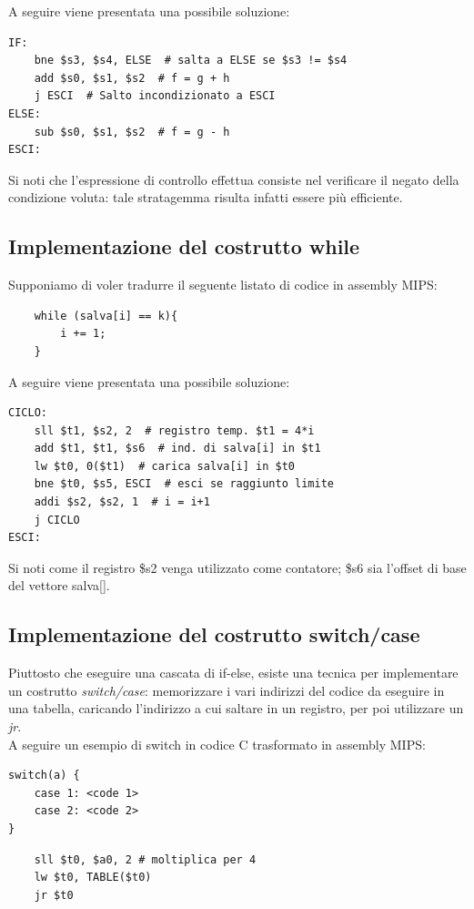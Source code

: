 \documentclass[class=book, crop=false]{standalone}
\begin{document}
A seguire viene presentata una possibile soluzione:
\begin{verbatim}
IF:
	bne $s3, $s4, ELSE  # salta a ELSE se $s3 != $s4
	add $s0, $s1, $s2  # f = g + h
	j ESCI  # Salto incondizionato a ESCI
ELSE:
	sub $s0, $s1, $s2  # f = g - h
ESCI:
\end{verbatim}
Si noti che l'espressione di controllo effettua consiste nel verificare il negato della condizione voluta: tale stratagemma risulta infatti essere più efficiente.

\subsection{Implementazione del costrutto while}
Supponiamo di voler tradurre il seguente listato di codice in assembly MIPS:
\begin{verbatim}
	while (salva[i] == k){
		i += 1;
	}
\end{verbatim}

A seguire viene presentata una possibile soluzione:
\begin{verbatim}
CICLO:
	sll $t1, $s2, 2  # registro temp. $t1 = 4*i
	add $t1, $t1, $s6  # ind. di salva[i] in $t1
	lw $t0, 0($t1)  # carica salva[i] in $t0
	bne $t0, $s5, ESCI  # esci se raggiunto limite
	addi $s2, $s2, 1  # i = i+1
	j CICLO
ESCI:
\end{verbatim}
Si noti come il registro \$s2 venga utilizzato come contatore; \$s6 sia l'offset di base del vettore salva[].

\subsection{Implementazione del costrutto switch/case}
Piuttosto che eseguire una cascata di if-else, esiste una tecnica per implementare un costrutto \emph{switch/case}: memorizzare i vari indirizzi del codice da eseguire in una tabella, caricando l'indirizzo a cui saltare in un registro, per poi utilizzare un \emph{jr}.\\
A seguire un esempio di switch in codice C trasformato in assembly MIPS:
\begin{verbatim}
switch(a) {
	case 1: <code 1>
	case 2: <code 2>
}
\end{verbatim}
\begin{verbatim}
	sll $t0, $a0, 2 # moltiplica per 4
	lw $t0, TABLE($t0)
	jr $t0
\end{verbatim}
\end{document}
